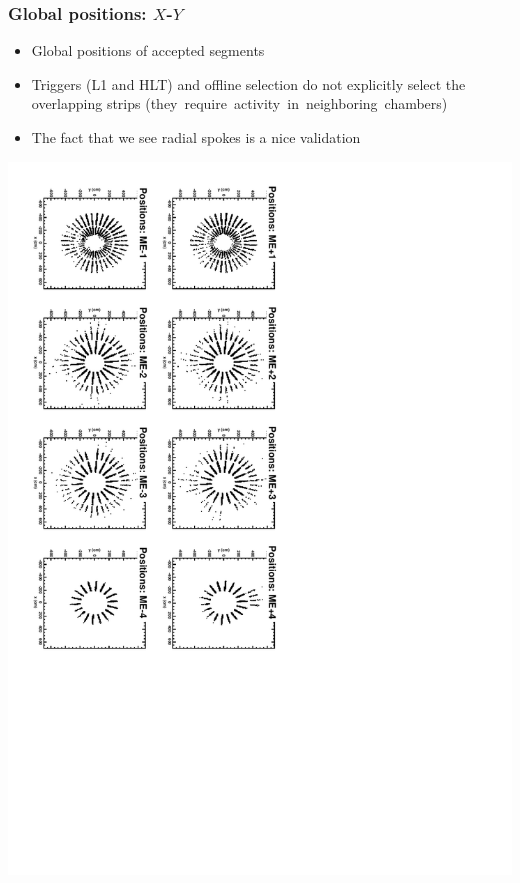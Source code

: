 \documentclass[compress]{beamer}
\begin{document}
\begin{frame}
\frametitle{Global positions: $X$-$Y$}
\begin{itemize}
\item Global positions of accepted segments
\item Triggers (L1 and HLT) and offline selection do not explicitly select the overlapping strips \mbox{(they require activity in neighboring chambers)\hspace{-1 cm}}
\item The fact that we see radial spokes is a nice validation
\end{itemize}

\vfill
\includegraphics[height=\linewidth, angle=90]{positions1.pdf}
\end{frame}
\end{document}
